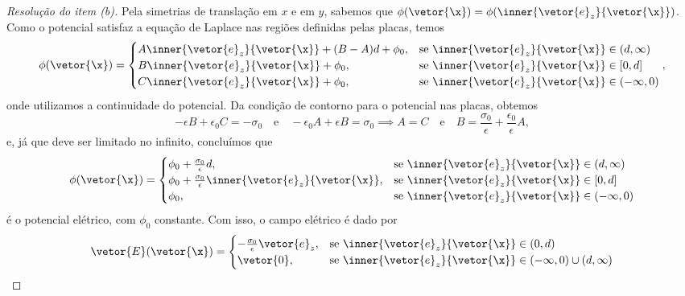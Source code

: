\begin{proof}[Resolução do item (b)]
    Pela simetrias de translação em \(x\) e em \(y\), sabemos que \(\phi(\vetor{\x}) = \phi(\inner{\vetor{e}_z}{\vetor{\x}})\). Como o potencial satisfaz a equação de Laplace nas regiões definidas pelas placas, temos
    \begin{equation*}
        \phi(\vetor{\x}) = \begin{cases}
            A\inner{\vetor{e}_z}{\vetor{\x}} + (B - A)d + \phi_0, &\text{se }\inner{\vetor{e}_z}{\vetor{\x}} \in(d, \infty)\\
            B\inner{\vetor{e}_z}{\vetor{\x}} + \phi_0,&\text{se }\inner{\vetor{e}_z}{\vetor{\x}} \in [0,d]\\
            C\inner{\vetor{e}_z}{\vetor{\x}} + \phi_0, &\text{se }\inner{\vetor{e}_z}{\vetor{\x}} \in (-\infty, 0)
        \end{cases},
    \end{equation*}
    onde utilizamos a continuidade do potencial. Da condição de contorno para o potencial nas placas, obtemos
    \begin{equation*}
        -\epsilon B + \epsilon_0 C = -\sigma_0\quad\text{e}\quad -\epsilon_0 A + \epsilon B = \sigma_0 \implies A = C \quad \text{e}\quad B = \frac{\sigma_0}{\epsilon} + \frac{\epsilon_0}{\epsilon} A,
    \end{equation*}
    e, já que deve ser limitado no infinito, concluímos que
    \begin{equation*}
        \phi(\vetor{\x}) = \begin{cases}
            \phi_0 + \frac{\sigma_0}{\epsilon}d, &\text{se }\inner{\vetor{e}_z}{\vetor{\x}} \in(d, \infty)\\
            \phi_0 + \frac{\sigma_0}{\epsilon}\inner{\vetor{e}_z}{\vetor{\x}},&\text{se }\inner{\vetor{e}_z}{\vetor{\x}} \in [0,d]\\
            \phi_0, &\text{se }\inner{\vetor{e}_z}{\vetor{\x}} \in (-\infty, 0)
        \end{cases}
    \end{equation*}
    é o potencial elétrico, com \(\phi_0\) constante. Com isso, o campo elétrico é dado por
    \begin{equation*}
        \vetor{E}(\vetor{\x}) = \begin{cases}
            - \frac{\sigma_0}{\epsilon}\vetor{e}_z,&\text{se }\inner{\vetor{e}_z}{\vetor{\x}} \in (0,d)\\
            \vetor{0}, &\text{se }\inner{\vetor{e}_z}{\vetor{\x}} \in (-\infty, 0) \cup (d, \infty)

\end{cases}
\end{equation*}
\end{proof}
